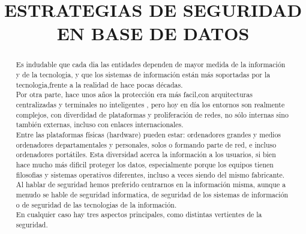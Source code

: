 \documentclass[conference]{IEEEtran}
\begin{document}
\title{ESTRATEGIAS DE SEGURIDAD EN BASE DE DATOS}
\maketitle


\begin{abstract}
Es indudable que cada dia las entidades dependen de mayor medida de la información y de la tecnologia, y que los sistemas de información están más soportadas por la tecnologia,frente a la realidad de hace pocas décadas.
\\
Por otra parte, hace unos años la protección era más facil,con arquitecturas centralizadas y terminales no inteligentes , pero hoy en día los entornos son realmente complejos, con diverdidad de plataformas y proliferación de redes, no sólo internas sino también externas, incluso con enlaces internacionales.
\\
Entre las plataformas físicas (hardware) pueden estar: ordenadores grandes y medios ordenadores departamentales y personales, solos o formando parte de red, e incluso ordenadores portátiles. Esta diversidad acerca la información a los usuarios, si bien hace mucho más dificil proteger los datos, especialmente porque los equipos tienen filosofias y sistemas operativos diferentes, incluso a veces siendo del mismo fabricante.
\\
Al hablar de seguridad hemos preferido centrarnos en la información misma, aunque a menudo se hable de seguridad informatica, de seguridad de los sistemas de información o de seguridad de las tecnologias de la información.
\\
En cualquier caso hay tres aspectos principales, como distintas vertientes de la seguridad.
\\
\end{abstract}
\end{document}
